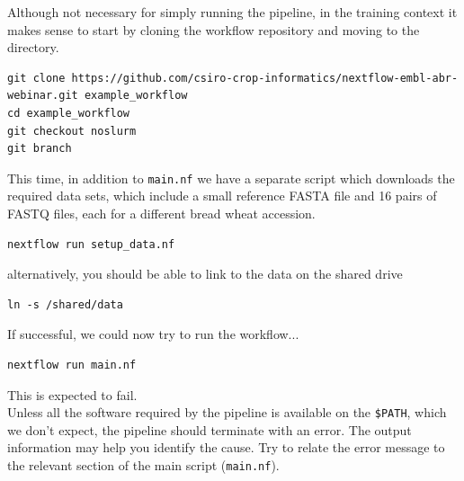 \begin{steps}
Although not necessary for simply running the pipeline, in the training context it makes sense to start by cloning the workflow repository and moving to the directory.

\begin{lstlisting}
git clone https://github.com/csiro-crop-informatics/nextflow-embl-abr-webinar.git example_workflow
cd example_workflow
git checkout noslurm
git branch
\end{lstlisting}

This time, in addition to \texttt{main.nf} we have a separate script which downloads the required data sets, which include a small reference FASTA file and 16 pairs of FASTQ files, each for a different bread wheat accession. 


\begin{lstlisting}
nextflow run setup_data.nf
\end{lstlisting}

alternatively, you should be able to link to the data on the shared drive

\begin{lstlisting}
ln -s /shared/data
\end{lstlisting}


If successful, we could now try to run the workflow...

\begin{lstlisting}
nextflow run main.nf
\end{lstlisting}

\begin{warning}
This is expected to fail.\\
Unless all the software required by the pipeline is available on the \texttt{\$PATH},
which we don't expect, the pipeline should terminate with an error.
The output information may help you identify the cause. 
Try to relate the error message to the relevant section of the main script (\texttt{main.nf}). 
\end{warning}
\end{steps}

